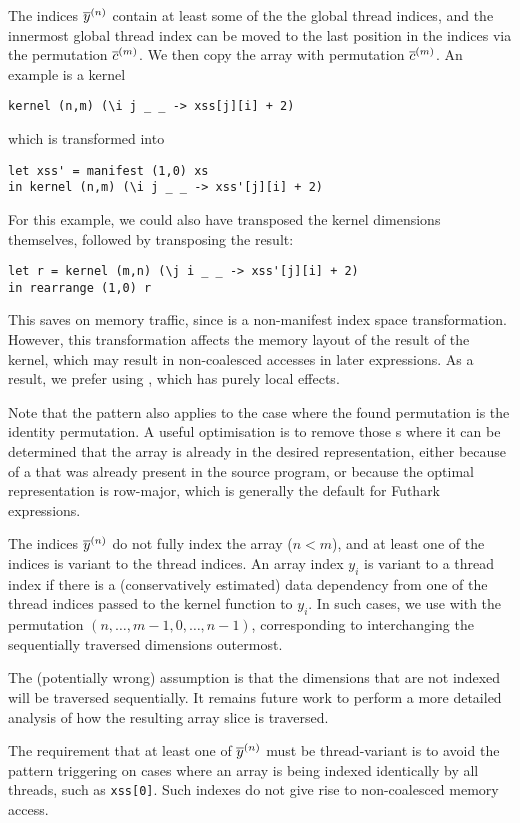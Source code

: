 \begin{description}[style=nextline]
\item[Complete Index]

  The indices $\overline{y}^{(n)}$ contain at least some of the the global
  thread indices, and the innermost global thread index can be moved
  to the last position in the indices via the permutation
  $\overline{c}^{(m)}$.  We then copy the array with permutation
  $\overline{c}^{(m)}$.  An example is a kernel
\begin{lstlisting}[numbers=none]
kernel (n,m) (\i j _ _ -> xss[j][i] + 2)
\end{lstlisting}
which is transformed into
\begin{lstlisting}[numbers=none]
let xss' = manifest (1,0) xs
in kernel (n,m) (\i j _ _ -> xss'[j][i] + 2)
\end{lstlisting}

For this example, we could also have transposed the kernel dimensions
themselves, followed by transposing the result:
\begin{lstlisting}[numbers=none]
let r = kernel (m,n) (\j i _ _ -> xss'[j][i] + 2)
in rearrange (1,0) r
\end{lstlisting}
This saves on memory traffic, since  is a non-manifest
index space transformation.  However, this transformation affects the
memory layout of the result of the kernel, which may result in
non-coalesced accesses in later expressions.  As a result, we prefer
using , which has purely local effects.

Note that the pattern also applies to the case where the found
permutation is the identity permutation.  A useful optimisation is to
remove those s where it can be determined that the array
is already in the desired representation, either because of a
 that was already present in the source program, or
because the optimal representation is row-major, which is generally
the default for Futhark expressions.

\item[Incomplete Index]

  The indices $\overline{y}^{(n)}$ do not fully index the array ($n<m$), and
  at least one of the indices is variant to the thread indices.  An
  array index $y_{i}$ is variant to a thread index if there is a
  (conservatively estimated) data dependency from one of the thread
  indices passed to the kernel function to $y_{i}$.  In such cases, we
  use  with the permutation
  $(n,\ldots,m-1,0,\ldots,n-1)$, corresponding to interchanging the
  sequentially traversed dimensions outermost.

  The (potentially wrong) assumption is that the dimensions that are
  not indexed will be traversed sequentially.  It remains future work
  to perform a more detailed analysis of how the resulting array slice
  is traversed.

  The requirement that at least one of $\overline{y}^{(n)}$ must be
  thread-variant is to avoid the pattern triggering on cases where an
  array is being indexed identically by all threads, such as
  \lstinline{xss[0]}.  Such indexes do not give rise to non-coalesced
  memory access.
\end{description}

